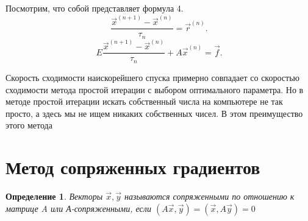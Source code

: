 \documentclass[a4paper,12pt]{article}
\newtheorem{defn}[theorem]{Определение}
\begin{document}
Посмотрим, что собой представляет формула 4.
\[
    \frac{ \vec{x}^{(n + 1)} - \vec{x}^{(n)} }{\tau_{n}} = \vec{r}^{(n)}
.\] 
\[
   E \frac{ \vec{x}^{(n + 1)} - \vec{x}^{(n)} }{ \tau_{n} } + A \vec{x}^{(n)} = \vec{f}
.\] 

Скорость сходимости наискорейшего спуска примерно совпадает со скоростью сходимости метода
простой итерации с выбором оптимального параметра. Но в методе простой итерации искать
собственный числа на компьютере не так просто, а здесь мы не ищем никаких собственных чисел.
В этом преимущество этого метода

\section{Метод сопряженных градиентов}%
\label{sec:метод_сопряженных_градиентов}

\begin{defn}
Векторы $ \vec{x}, \vec{y}$ называются сопряженными по отношению к матрице A или А-сопряженными,
если $( A \vec{x}, \vec{y}) = ( \vec{x}, A \vec{y} ) = 0$
\end{defn}
\end{document}
